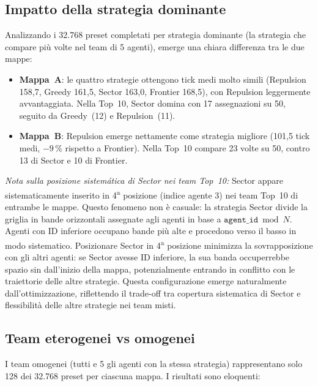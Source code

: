 \subsection{Impatto della strategia dominante}

Analizzando i 32.768 preset completati per strategia dominante
(la strategia che compare pi\`u volte nel team di 5 agenti), emerge una chiara
differenza tra le due mappe:

\begin{itemize}
  \item \textbf{Mappa~A}: le quattro strategie ottengono tick medi molto simili
        (Repulsion 158{,}7, Greedy 161{,}5, Sector 163{,}0, Frontier 168{,}5),
        con Repulsion leggermente avvantaggiata.
        Nella Top~10, Sector domina con 17 assegnazioni su 50, seguito da
        Greedy~(12) e Repulsion~(11).
    \item \textbf{Mappa~B}: Repulsion emerge nettamente come strategia migliore
      (101{,}5 tick medi, $-9\,\%$ rispetto a Frontier).
        Nella Top~10 compare 23 volte su 50, contro 13 di Sector e 10 di Frontier.
\end{itemize}

\textit{Nota sulla posizione sistemática di Sector nei team Top~10:}
Sector appare sistematicamente inserito in 4\textsuperscript{a} posizione
(indice agente 3) nei team Top~10 di entrambe le mappe. Questo fenomeno non \`e casuale:
la strategia Sector divide la griglia in bande orizzontali assegnate agli agenti in base a
$\texttt{agent\_id} \bmod N$. Agenti con ID inferiore occupano bande pi\`u alte e procedono
verso il basso in modo sistematico. Posizionare Sector in 4\textsuperscript{a} posizione
minimizza la sovrapposizione con gli altri agenti: se Sector avesse ID inferiore,
la sua banda occuperrebbe spazio sin dall'inizio della mappa, potenzialmente entrando
in conflitto con le traiettorie delle altre strategie. Questa configurazione emerge
naturalmente dall'ottimizzazione, riflettendo il trade-off tra copertura sistematica
di Sector e flessibilità delle altre strategie nei team misti.

\subsection{Team eterogenei vs omogenei}

I team omogenei (tutti e 5 gli agenti con la stessa strategia) rappresentano
solo 128 dei 32.768 preset per ciascuna mappa. I risultati sono eloquenti:

